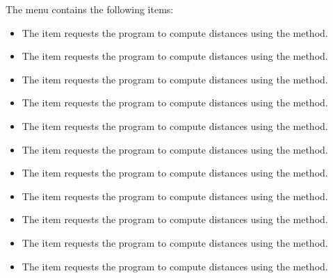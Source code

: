\documentclass[11pt]{article}
\begin{document}
The  menu contains the following items:
\begin{itemize}
\item The  item 
requests the program to compute distances using the  method.
\item The  item
requests the program to compute distances using the  method.
\item The  item
requests the program to compute distances using the  method.
\item The  item
requests the program to compute distances using the  method.
\item The  item
requests the program to compute distances using the  method.
\item The  item
requests the program to compute distances using the  method.
\item The  item
requests the program to compute distances using the  method.
\item The  item
requests the program to compute distances using the  method.
\item The  item
requests the program to compute distances using the 
method.
\item The  item
requests the program to compute distances using the  method.
\item The  item
requests the program to compute distances using the
 method.
\end{itemize}
\end{document}
